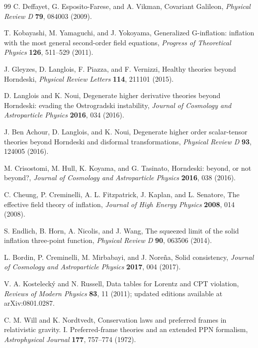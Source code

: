 \documentclass[12pt,a4paper]{article}
\begin{document}
\begin{thebibliography}{99}
C. Deffayet, G. Esposito-Farese, and A. Vikman, Covariant Galileon, \textit{Physical Review D} \textbf{79}, 084003 (2009).

T. Kobayashi, M. Yamaguchi, and J. Yokoyama, Generalized G-inflation: inflation with the most general second-order field equations, \textit{Progress of Theoretical Physics} \textbf{126}, 511--529 (2011).

J. Gleyzes, D. Langlois, F. Piazza, and F. Vernizzi, Healthy theories beyond Horndeski, \textit{Physical Review Letters} \textbf{114}, 211101 (2015).

D. Langlois and K. Noui, Degenerate higher derivative theories beyond Horndeski: evading the Ostrogradski instability, \textit{Journal of Cosmology and Astroparticle Physics} \textbf{2016}, 034 (2016).

J. Ben Achour, D. Langlois, and K. Noui, Degenerate higher order scalar-tensor theories beyond Horndeski and disformal transformations, \textit{Physical Review D} \textbf{93}, 124005 (2016).

M. Crisostomi, M. Hull, K. Koyama, and G. Tasinato, Horndeski: beyond, or not beyond?, \textit{Journal of Cosmology and Astroparticle Physics} \textbf{2016}, 038 (2016).

C. Cheung, P. Creminelli, A. L. Fitzpatrick, J. Kaplan, and L. Senatore, The effective field theory of inflation, \textit{Journal of High Energy Physics} \textbf{2008}, 014 (2008).

S. Endlich, B. Horn, A. Nicolis, and J. Wang, The squeezed limit of the solid inflation three-point function, \textit{Physical Review D} \textbf{90}, 063506 (2014).

L. Bordin, P. Creminelli, M. Mirbabayi, and J. Nore\~na, Solid consistency, \textit{Journal of Cosmology and Astroparticle Physics} \textbf{2017}, 004 (2017).

V. A. Kosteleck\'y and N. Russell, Data tables for Lorentz and CPT violation, \textit{Reviews of Modern Physics} \textbf{83}, 11 (2011); updated editions available at arXiv:0801.0287.

C. M. Will and K. Nordtvedt, Conservation laws and preferred frames in relativistic gravity. I. Preferred-frame theories and an extended PPN formalism, \textit{Astrophysical Journal} \textbf{177}, 757--774 (1972).


\end{thebibliography}
\end{document}
